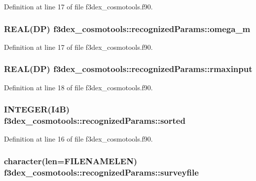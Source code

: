 Definition at line 17 of file f3dex\_\-cosmotools.f90.

\hypertarget{typef3dex__cosmotools_1_1recognized_params_a9694f2e73db534d756551e0574fec699}{
\subsubsection[{omega\_\-m}]{\setlength{\rightskip}{0pt plus 5cm}REAL(DP) {\bf f3dex\_\-cosmotools::recognizedParams::omega\_\-m}}}
\label{typef3dex__cosmotools_1_1recognized_params_a9694f2e73db534d756551e0574fec699}


Definition at line 17 of file f3dex\_\-cosmotools.f90.

\hypertarget{typef3dex__cosmotools_1_1recognized_params_a294186863347b6b31dba6e5d547967cb}{
\subsubsection[{rmaxinput}]{\setlength{\rightskip}{0pt plus 5cm}REAL(DP) {\bf f3dex\_\-cosmotools::recognizedParams::rmaxinput}}}
\label{typef3dex__cosmotools_1_1recognized_params_a294186863347b6b31dba6e5d547967cb}


Definition at line 18 of file f3dex\_\-cosmotools.f90.

\hypertarget{typef3dex__cosmotools_1_1recognized_params_a09746178e4eccb40629aec42894f2ba6}{
\subsubsection[{sorted}]{\setlength{\rightskip}{0pt plus 5cm}INTEGER(I4B) {\bf f3dex\_\-cosmotools::recognizedParams::sorted}}}
\label{typef3dex__cosmotools_1_1recognized_params_a09746178e4eccb40629aec42894f2ba6}


Definition at line 16 of file f3dex\_\-cosmotools.f90.

\hypertarget{typef3dex__cosmotools_1_1recognized_params_a7efee7086908340e3aa2bd28ce5b9005}{
\subsubsection[{surveyfile}]{\setlength{\rightskip}{0pt plus 5cm}character(len=FILENAMELEN) {\bf f3dex\_\-cosmotools::recognizedParams::surveyfile}}}
\label{typef3dex__cosmotools_1_1recognized_params_a7efee7086908340e3aa2bd28ce5b9005}


